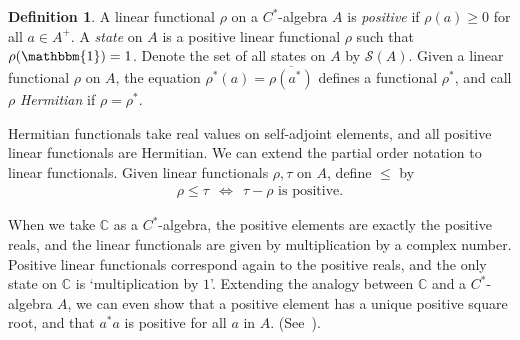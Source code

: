 \documentclass[11pt,a4paper]{report}
\theoremstyle{plain}
\theoremstyle{definition}
\newtheorem*{defn}{Definition}
\newcommand{\1}{\mathbbm{1}}
\newcommand{\C}{\mathbb{C}}
\renewcommand{\S}{\mathscr{S}}
\renewcommand{\bar}{\overline}
\begin{document}
\begin{defn}
	A linear functional $\rho$ on a $C^\ast$-algebra $A$ is \emph{positive} if 
	$\rho(a)\geq 0$ for all $a\in A^+$. A \emph{state} on $A$ is a positive linear 
	functional $\rho$ such that $\rho(\1)=1$. Denote the set of all states on $A$ by 
	$\S(A)$. Given a linear functional $\rho$ on $A$, the equation $\rho^\ast(a) 
	=\bar{\rho(a^\ast)}$ defines a functional $\rho^\ast$, and call $\rho$ 
	\emph{Hermitian} if $\rho=\rho^\ast$.

\end{defn}
Hermitian functionals take real values on self-adjoint elements, and all 
positive linear functionals are Hermitian. We can extend the partial order 
notation to linear functionals. Given linear functionals $\rho,\tau$ on $A$, 
define $\leq$ by
\begin{align*}
	\rho \leq \tau ~~\iff~~ \tau - \rho \mbox{ is positive}.
\end{align*}

When we take $\C$ as a $C^\ast$-algebra, the positive elements are exactly the 
positive reals, and the linear functionals are given by multiplication by a 
complex number. Positive linear functionals correspond again to the positive 
reals, and the only state on $\C$ is `multiplication by $1$'.
Extending the analogy between $\C$ and a $C^\ast$-algebra $A$, we can even show 
that a positive element has a unique positive square root, and that $a^\ast a$ 
is positive for all $a$ in $A$. (See~\cite[4.2.5 and 4.2.6]{kadison83}).
\end{document}
